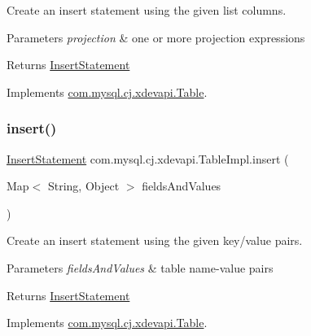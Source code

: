 Create an insert statement using the given list columns.


\begin{DoxyParams}{Parameters}
{\em projection} & one or more projection expressions \\
\hline
\end{DoxyParams}
\begin{DoxyReturn}{Returns}
\mbox{\hyperlink{interfacecom_1_1mysql_1_1cj_1_1xdevapi_1_1_insert_statement}{Insert\+Statement}} 
\end{DoxyReturn}


Implements \mbox{\hyperlink{interfacecom_1_1mysql_1_1cj_1_1xdevapi_1_1_table_a67eccc4ea9487430c524001bdd912180}{com.\+mysql.\+cj.\+xdevapi.\+Table}}.

\mbox{\label{classcom_1_1mysql_1_1cj_1_1xdevapi_1_1_table_impl_acc6cac6129c86ac4ec2a7ce02303b4bb}} 
\subsubsection{\texorpdfstring{insert()}{insert()}\hspace{0.1cm}{\footnotesize\ttfamily [3/3]}}
{\footnotesize\ttfamily \mbox{\hyperlink{interfacecom_1_1mysql_1_1cj_1_1xdevapi_1_1_insert_statement}{Insert\+Statement}} com.\+mysql.\+cj.\+xdevapi.\+Table\+Impl.\+insert (\begin{DoxyParamCaption}\item[{Map$<$ String, Object $>$}]{fields\+And\+Values }\end{DoxyParamCaption})}

Create an insert statement using the given key/value pairs.


\begin{DoxyParams}{Parameters}
{\em fields\+And\+Values} & table name-\/value pairs \\
\hline
\end{DoxyParams}
\begin{DoxyReturn}{Returns}
\mbox{\hyperlink{interfacecom_1_1mysql_1_1cj_1_1xdevapi_1_1_insert_statement}{Insert\+Statement}} 
\end{DoxyReturn}


Implements \mbox{\hyperlink{interfacecom_1_1mysql_1_1cj_1_1xdevapi_1_1_table_a2a66f6dde400c00f896c02673e7fdc84}{com.\+mysql.\+cj.\+xdevapi.\+Table}}.

